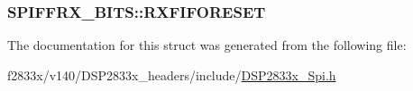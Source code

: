 \subsubsection[{R\+X\+F\+I\+F\+O\+R\+E\+S\+E\+T}]{ S\+P\+I\+F\+F\+R\+X\+\_\+\+B\+I\+T\+S\+::\+R\+X\+F\+I\+F\+O\+R\+E\+S\+E\+T}\label{struct_s_p_i_f_f_r_x___b_i_t_s_a5116388be4972695413bb7c247baca0c}


The documentation for this struct was generated from the following file\+:\begin{DoxyCompactItemize}
\item 
f2833x/v140/\+D\+S\+P2833x\+\_\+headers/include/\hyperlink{_d_s_p2833x___spi_8h}{D\+S\+P2833x\+\_\+\+Spi.\+h}\end{DoxyCompactItemize}
